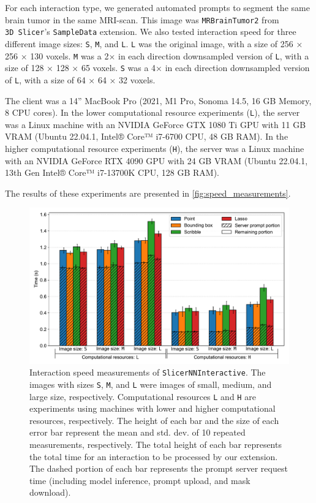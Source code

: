 \documentclass[
]{article}
\begin{document}
For each interaction type, we generated automated prompts to segment the
same brain tumor in the same MRI-scan. This image was
\texttt{MRBrainTumor2} from \texttt{3D\ Slicer}'s \texttt{SampleData}
extension. We also tested interaction speed for three different image
sizes: \texttt{S}, \texttt{M}, and \texttt{L}. \texttt{L} was the
original image, with a size of 256 × 256 × 130 voxels. \texttt{M} was a
2× in each direction downsampled version of \texttt{L}, with a size of
128 × 128 × 65 voxels. \texttt{S} was a 4× in each direction downsampled
version of \texttt{L}, with a size of 64 × 64 × 32 voxels.

The client was a 14'' MacBook Pro (2021, M1 Pro, Sonoma 14.5, 16 GB
Memory, 8 CPU cores). In the lower computational resource experiments
(\texttt{L}), the server was a Linux machine with an NVIDIA GeForce GTX
1080 Ti GPU with 11 GB VRAM (Ubuntu 22.04.1, Intel® Core™ i7-6700 CPU,
48 GB RAM). In the higher computational resource experiments
(\texttt{H}), the server was a Linux machine with an NVIDIA GeForce RTX
4090 GPU with 24 GB VRAM (Ubuntu 22.04.1, 13th Gen Intel® Core™
i7-13700K CPU, 128 GB RAM).

The results of these experiments are presented in
\autoref{fig:speed_measurements}.

\begin{figure}
\centering
\includegraphics{img/speed_measurements.pdf}
\caption{Interaction speed measurements of \texttt{SlicerNNInteractive}.
The images with sizes \texttt{S}, \texttt{M}, and \texttt{L} were images
of small, medium, and large size, respectively. Computational resources
\texttt{L} and \texttt{H} are experiments using machines with lower and
higher computational resources, respectively. The height of each bar and
the size of each error bar represent the mean and std. dev. of 10
repeated measurements, respectively. The total height of each bar
represents the total time for an interaction to be processed by our
extension. The dashed portion of each bar represents the prompt server
request time (including model inference, prompt upload, and mask
download).\label{fig:speed_measurements}}
\end{figure}
\end{document}
